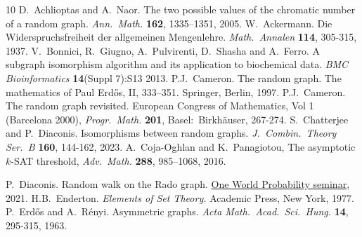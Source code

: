 \documentclass[reqno]{amsart}
\theoremstyle{theorem}
\theoremstyle{definition}
\theoremstyle{remark}
\newcommand{\1}{{\text{\Large $\mathfrak 1$}}}	%
\numberwithin{equation}{section}
\begin{document}
\renewcommand\refname{\bfseries References}

\begin{thebibliography}{10}
D.\ Achlioptas and A.\ Naor.
The two possible values of the chromatic number of a random graph.
{\em Ann.\ Math.} {\bf 162}, 1335--1351, 2005.
W.\ Ackermann. 
Die Widerspruchsfreiheit der allgemeinen Mengenlehre.
{\em Math.\ Annalen} {\bf 114}, 305-315, 1937.
V.\ Bonnici, R.\ Giugno, A.\ Pulvirenti, D.\ Shasha and A.\ Ferro.
A subgraph isomorphism algorithm and its application to biochemical data.
{\em BMC Bioinformatics} {\bf 14}(Suppl 7):S13 2013.
P.J.\  Cameron.
The random graph.
The mathematics of Paul Erd\H{o}s, II,
333–351. Springer, Berlin, 1997.
P.J.\  Cameron.
The random graph revisited.
European Congress of Mathematics, Vol 1 (Barcelona 2000),
{\em Progr.\ Math.} {\bf 201}, Basel:\ Birkh\"auser, 267-274.
S.\ Chatterjee and P.\ Diaconis. 
Isomorphisms between random graphs.
{\em J.\ Combin.\ Theory Ser.\ B} {\bf 160}, 144-162, 2023.
A.\ Coja-Oghlan and K.\ Panagiotou, 
The asymptotic $k$-SAT threshold, 
{\em Adv.\ Math.} {\bf 288}, 985--1068, 2016.

{}
P.\ Diaconis. Random walk on the Rado graph.
\href{https://drive.google.com/file/d/1I-4EmXDqPA6LSHmm7ytsoW7fuzStBla_/view}
{One World Probability seminar},
2021.
H.B.\ Enderton.
{\em Elements of Set Theory.}
Academic Press, New York, 1977.
P.\ Erd\H{o}s and A.\ R\'enyi. 
Asymmetric graphs.
{\em Acta Math.\ Acad.\ Sci.\ Hung.} {\bf 14}, 295-315, 1963.

\end{thebibliography}
\end{document}
